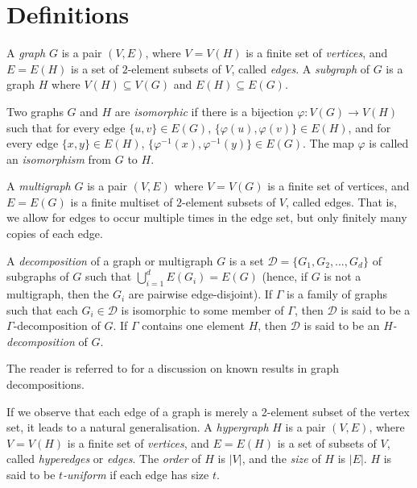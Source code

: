 \section{Definitions}


A {\em graph} $G$ is a pair $(V, E)$, where $V = V(H)$ is a finite set of {\em vertices}, and $E = E(H)$ is a set of $2$-element subsets of $V$, called {\em edges}.
A {\em subgraph} of $G$ is a graph $H$ where $V(H) \subseteq V(G)$ and $E(H) \subseteq E(G)$.

Two graphs $G$ and $H$ are {\em isomorphic} if there is a bijection $\varphi : V(G) \to V(H)$ such that for every edge $\{u, v\} \in E(G)$, $\{\varphi(u), \varphi(v)\} \in E(H)$, and for every edge $\{x, y\} \in E(H)$, $\{\varphi^{-1}(x), \varphi^{-1}(y)\} \in E(G)$. The map $\varphi$ is called an {\em isomorphism} from $G$ to $H$.


A {\em multigraph} $G$ is a pair $(V, E)$ where $V = V(G)$ is a finite set of vertices, and $E = E(G)$ is a finite multiset of $2$-element subsets of $V$, called edges. That is, we allow for edges to occur multiple times in the
edge set, but only finitely many copies of each edge.

A {\em decomposition} of a graph or multigraph $G$ is a set $\mathcal{D} = \{G_1, G_2, \ldots, G_d\}$ of
subgraphs of $G$ such that $\bigcup_{i=1}^d E(G_i) = E(G)$ (hence, if $G$ is not a multigraph, then the $G_i$ are pairwise edge-disjoint).
If $\Gamma$ is a family of graphs such that each $G_i \in \mathcal{D}$ is isomorphic to some
member of $\Gamma$, then $\mathcal{D}$ is said to be a $\Gamma$-decomposition of $G$.
If $\Gamma$ contains one element $H$, then $\mathcal{D}$ is said to be an
{\em $H$-decomposition} of $G$.

The reader is referred to \cite{bryant-graph} for a discussion on known results
in graph decompositions.

If we observe that each edge of a graph is merely a 2-element subset of the
vertex set, it leads to a natural generalisation.
A {\em hypergraph} $H$ is a pair $(V, E)$, where $V = V(H)$ is a finite set of
{\em vertices}, and $E = E(H)$ is a set of subsets of $V$, called {\em
hyperedges} or {\em edges}.
The {\em order} of $H$ is $|V|$, and the {\em size} of $H$ is $|E|$.
$H$ is said to be {\em $t$-uniform} if each edge has size $t$.

